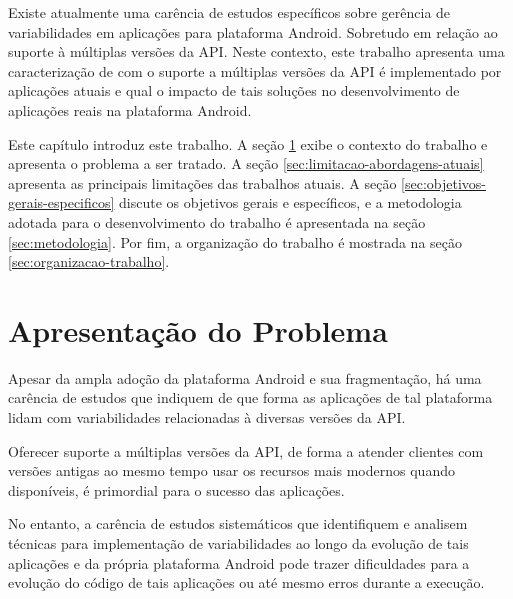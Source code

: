 Existe atualmente uma carência de estudos específicos sobre gerência de variabilidades
em aplicações para plataforma Android. Sobretudo em relação ao suporte à múltiplas
versões da API. Neste contexto, este trabalho apresenta uma caracterização de com
o suporte a múltiplas versões da API é implementado por aplicações atuais e qual
o impacto de tais soluções no desenvolvimento de aplicações reais na plataforma
Android.

Este capítulo introduz este trabalho. A seção \ref{sec:apresentacao-do-problema}
exibe o contexto do trabalho e apresenta o problema a ser tratado. A seção \ref{sec:limitacao-abordagens-atuais}
apresenta as principais limitações das trabalhos atuais. A seção \ref{sec:objetivos-gerais-especificos}
discute os objetivos gerais e específicos, e a metodologia adotada para o desenvolvimento
do trabalho é apresentada na seção \ref{sec:metodologia}. Por fim, a organização do trabalho
é mostrada na seção \ref{sec:organizacao-trabalho}.

\section{Apresentação do Problema} \label{sec:apresentacao-do-problema}

Apesar da ampla adoção da plataforma Android e sua fragmentação, há uma carência
de estudos que indiquem de que forma as aplicações de tal plataforma lidam com
variabilidades relacionadas à diversas versões da API.

Oferecer suporte a múltiplas versões da API, de forma a atender clientes com
versões antigas ao mesmo tempo usar os recursos mais modernos quando disponíveis,
é primordial para o sucesso das aplicações.

No entanto, a carência de estudos sistemáticos que identifiquem e analisem técnicas
para implementação de variabilidades ao longo da evolução de tais aplicações e da
própria plataforma Android pode trazer dificuldades para a evolução do código de
tais aplicações ou até mesmo erros durante a execução.

